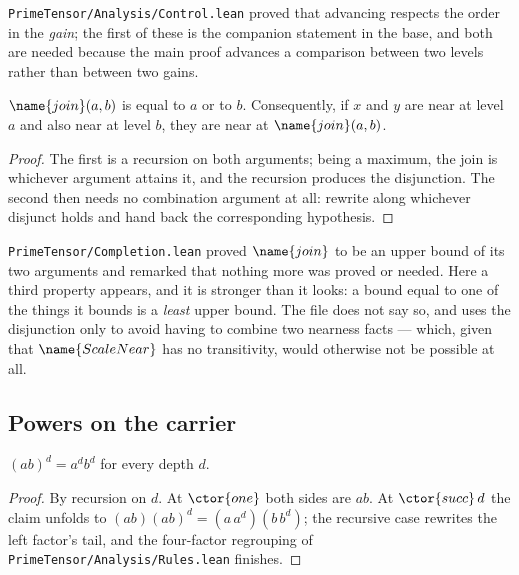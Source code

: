 \texttt{PrimeTensor/Analysis/Control.lean} proved that advancing respects the
order in the \emph{gain}; the first of these is the companion statement in the
base, and both are needed because the main proof advances a comparison between
two levels rather than between two gains.

\begin{lemma}\label{Analysis:Power:Growth:lem:join}
$\name{join}(a,b)$ is equal to $a$ or to $b$.  Consequently, if $x$ and $y$ are
near at level $a$ and also near at level $b$, they are near at
$\name{join}(a,b)$.
\end{lemma}

\begin{proof}
The first is a recursion on both arguments; being a maximum, the join is
whichever argument attains it, and the recursion produces the disjunction.  The
second then needs no combination argument at all: rewrite along whichever
disjunct holds and hand back the corresponding hypothesis.
\end{proof}

\begin{remark}\label{Analysis:Power:Growth:rem:join}
\texttt{PrimeTensor/Completion.lean} proved $\name{join}$ to be an upper bound
of its two arguments and remarked that nothing more was proved or needed.  Here
a third property appears, and it is stronger than it looks: a bound equal to
one of the things it bounds is a \emph{least} upper bound.  The file does not
say so, and uses the disjunction only to avoid having to combine two nearness
facts --- which, given that $\name{ScaleNear}$ has no transitivity, would
otherwise not be possible at all.
\end{remark}

\subsection{Powers on the carrier}

\begin{lemma}\label{Analysis:Power:Growth:lem:pow-mul}
$(ab)^{d} = a^{d} b^{d}$ for every depth $d$.
\end{lemma}

\begin{proof}
By recursion on $d$.  At $\ctor{one}$ both sides are $ab$.  At
$\ctor{succ}\,d$ the claim unfolds to
$(ab)(ab)^{d} = (a\,a^{d})(b\,b^{d})$; the recursive case rewrites the left
factor's tail, and the four-factor regrouping of
\texttt{PrimeTensor/Analysis/Rules.lean} finishes.
\end{proof}

